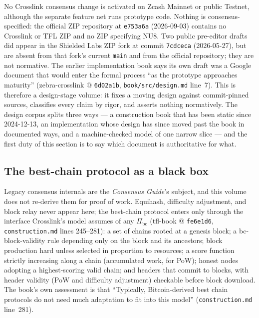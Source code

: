 \documentclass[11pt,a4paper]{article}
\theoremstyle{definition}
\begin{document}
No Crosslink consensus change is activated on Zcash Mainnet or public
Testnet, although the separate feature net runs prototype code. Nothing is
consensus-specified: the official ZIP repository at \texttt{e753a6a}
(2026-09-03) contains no Crosslink or TFL ZIP and no ZIP specifying NU8.
Two public
pre-editor drafts did appear in the Shielded Labs ZIP fork at commit
\texttt{7cdceca} (2026-05-27), but are absent from that fork's current
\texttt{main} and from the official repository; they are not normative.
The earlier implementation book says its own draft was a Google document
that would enter the formal process ``as the prototype approaches
maturity'' (zebra-crosslink @ \texttt{6d02a1b},
\texttt{book/src/design.md} line~7). This is therefore a design-stage
volume: it fixes a moving design against commit-pinned sources, classifies
every claim by rigor, and asserts nothing normatively.
The design corpus splits three
ways --- a construction book that has been static since 2024-12-13, an
implementation whose design has since moved past the book in documented
ways, and a machine-checked model of one narrow slice --- and the first
duty of this section is to say which document is authoritative for what.

\subsection{The best-chain protocol as a black box}\label{sec:xl-blackbox}

Legacy consensus internals are the \emph{Consensus Guide}'s subject,
and this volume does not re-derive them for proof of work. Equihash, difficulty
adjustment, and block relay never appear here; the best-chain protocol
enters only through the interface Crosslink's model assumes of any
$\Pi_{\mathrm{bc}}$ (tfl-book @ \texttt{fe6e1d6},
\texttt{construction.md} lines 245--281): a set of chains rooted at a
genesis block; a bc-block-validity rule depending only on the block and
its ancestors; block production hard unless selected in proportion to
resources; a score function strictly increasing along a chain
(accumulated work, for PoW); honest nodes adopting a highest-scoring
valid chain; and headers that commit to blocks, with header validity
(PoW and difficulty adjustment) checkable before block download. The
book's own assessment is that ``Typically, Bitcoin-derived best chain
protocols do not need much adaptation to fit into this model''
(\texttt{construction.md} line~281).
\end{document}

